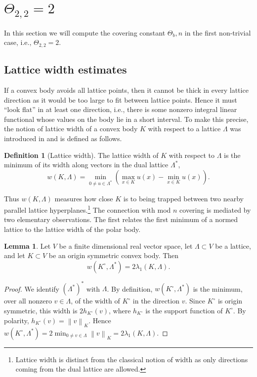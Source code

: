\documentclass[11pt,reqno]{amsart}
\numberwithin{equation}{section}
\numberwithin{equation}{section}
\theoremstyle{definition}
\newtheorem{lemma}[theorem]{Lemma}
\newtheorem{definition}[theorem]{Definition}
\newcommand{\norm}[1]{\left\lVert #1\right\rVert}
\begin{document}
\section{$\Theta_{2,2}=2$}
\label{sec:theta-two} In this section we will compute the covering constant $\Theta_b,n$ in the first non-trivial case, i.e., $\Theta_{2,2}=2$. 

\subsection{Lattice width estimates}

If a convex body avoids all lattice points, then it cannot be thick in every lattice direction as it would be too large to fit between lattice points. Hence it must ``look flat'' in at least one direction, i.e., there is some nonzero integral linear functional whose values on the body lie in a short interval. To make this precise, the notion of lattice width of a convex body $K$ with respect to a lattice \(\Lambda\) was introduced in \cite{KL88} and is defined as follows.

\begin{definition}[Lattice width]
The lattice width of \(K\) with respect to \(\Lambda\) is the minimum of its width along vectors in the dual lattice \(\Lambda^\ast\),
\[
w(K,\Lambda)
=
\min_{0\neq u\in\Lambda^\ast}
\left(
\max_{x\in K}u(x)-\min_{x\in K}u(x)
\right).
\]
\end{definition}

Thus \(w(K,\Lambda)\) measures how close \(K\) is to being trapped between two nearby parallel lattice hyperplanes.\footnote{Lattice width is distinct from the classical notion of width as only directions coming from the dual lattice are allowed.} The connection with mod \(n\) covering is mediated by two elementary observations. The first relates the first minimum of a normed lattice to the lattice width of the polar body.

\begin{lemma}\label{lem:polar-width}
Let \(V\) be a finite dimensional real vector space, let \(\Lambda\subset V\) be a lattice, and let \(K\subset V\) be an origin symmetric convex body. Then
\[
w(K^\circ,\Lambda^\ast)=2\lambda_1(K,\Lambda).
\]
\end{lemma}

\begin{proof}
We identify \((\Lambda^\ast)^\ast\) with \(\Lambda\). By definition, \(w(K^\circ,\Lambda^\ast)\) is the minimum, over all nonzero \(v\in\Lambda\), of the width of \(K^\circ\) in the direction \(v\). Since \(K^\circ\) is origin symmetric, this width is \(2h_{K^\circ}(v)\), where \(h_{K^\circ}\) is the support function of \(K^\circ\). By polarity, \(h_{K^\circ}(v)=\norm{v}_K\). Hence \(w(K^\circ,\Lambda^\ast)=2\min_{0\neq v\in\Lambda}\norm{v}_K=2\lambda_1(K,\Lambda)\).
\end{proof}
\end{document}
